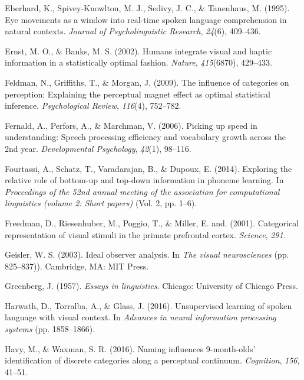 \documentclass[english,floatsintext,man]{apa6}
\theoremstyle{definition}
\theoremstyle{definition}
\theoremstyle{definition}
\theoremstyle{remark}
\begin{document}
\hypertarget{ref-Eberhard1995}{}
Eberhard, K., Spivey-Knowlton, M. J., Sedivy, J. C., \& Tanenhaus, M.
(1995). Eye movements as a window into real-time spoken language
comprehension in natural contexts. \emph{Journal of Psycholinguistic
Research}, \emph{24}(6), 409--436.

\hypertarget{ref-ernst02}{}
Ernst, M. O., \& Banks, M. S. (2002). Humans integrate visual and haptic
information in a statistically optimal fashion. \emph{Nature},
\emph{415}(6870), 429--433.

\hypertarget{ref-feldman2009}{}
Feldman, N., Griffiths, T., \& Morgan, J. (2009). The influence of
categories on perception: Explaining the perceptual magnet effect as
optimal statistical inference. \emph{Psychological Review},
\emph{116}(4), 752--782.

\hypertarget{ref-fernald2006}{}
Fernald, A., Perfors, A., \& Marchman, V. (2006). Picking up speed in
understanding: Speech processing efficiency and vocabulary growth across
the 2nd year. \emph{Developmental Psychology}, \emph{42}(1), 98--116.

\hypertarget{ref-fourtassi2014b}{}
Fourtassi, A., Schatz, T., Varadarajan, B., \& Dupoux, E. (2014).
Exploring the relative role of bottom-up and top-down information in
phoneme learning. In \emph{Proceedings of the 52nd annual meeting of the
association for computational linguistics (volume 2: Short papers)}
(Vol. 2, pp. 1--6).

\hypertarget{ref-freedman2001}{}
Freedman, D., Riesenhuber, M., Poggio, T., \& Miller, E. and. (2001).
Categorical representation of visual stimuli in the primate prefrontal
cortex. \emph{Science}, \emph{291}.

\hypertarget{ref-Geisler2003}{}
Geisler, W. S. (2003). Ideal observer analysis. In \emph{The visual
neurosciences} (pp. 825--837)). Cambridge, MA: MIT Press.

\hypertarget{ref-greenberg1957}{}
Greenberg, J. (1957). \emph{Essays in linguistics}. Chicago: University
of Chicago Press.

\hypertarget{ref-harwath2016}{}
Harwath, D., Torralba, A., \& Glass, J. (2016). Unsupervised learning of
spoken language with visual context. In \emph{Advances in neural
information processing systems} (pp. 1858--1866).

\hypertarget{ref-havy2016}{}
Havy, M., \& Waxman, S. R. (2016). Naming influences 9-month-olds'
identification of discrete categories along a perceptual continuum.
\emph{Cognition}, \emph{156}, 41--51.
\end{document}
